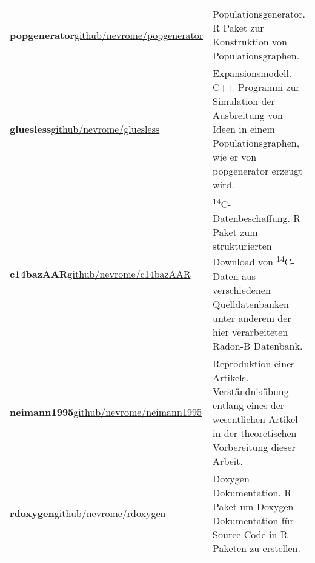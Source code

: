 \documentclass[openany,twoside,twocolumn]{book}
\begin{document}
\begin{table}
\begin{tabular}[t]{>{\raggedright\arraybackslash}p{20em}>{\raggedright\arraybackslash}p{25em}}
\textbf{popgenerator}\newline \href{https://www.github.com/nevrome/popgenerator}{github/nevrome/popgenerator} & Populationsgenerator. R Paket zur Konstruktion von Populationsgraphen.\\
\addlinespace
\textbf{gluesless}\newline \href{https://www.github.com/nevrome/gluesless}{github/nevrome/gluesless} & Expansionsmodell. C++ Programm zur Simulation der Ausbreitung von Ideen in einem Populationsgraphen, wie er von popgenerator erzeugt wird.\\
\textbf{c14bazAAR}\newline \href{https://www.github.com/nevrome/c14bazAAR}{github/nevrome/c14bazAAR} & \textsuperscript{14}C-Datenbeschaffung. R Paket zum strukturierten Download von \textsuperscript{14}C-Daten aus verschiedenen Quelldatenbanken -- unter anderem der hier verarbeiteten Radon-B Datenbank.\\
\textbf{neimann1995}\newline \href{https://www.github.com/nevrome/neimann1995}{github/nevrome/neimann1995} & Reproduktion eines Artikels. Verständnisübung entlang eines der wesentlichen Artikel in der theoretischen Vorbereitung dieser Arbeit.\\
\textbf{rdoxygen}\newline \href{https://www.github.com/nevrome/rdoxygen}{github/nevrome/rdoxygen} & Doxygen Dokumentation. R Paket um Doxygen Dokumentation für Source Code in R Paketen zu erstellen.\\
\bottomrule
\end{tabular}
\end{table}
\end{document}
